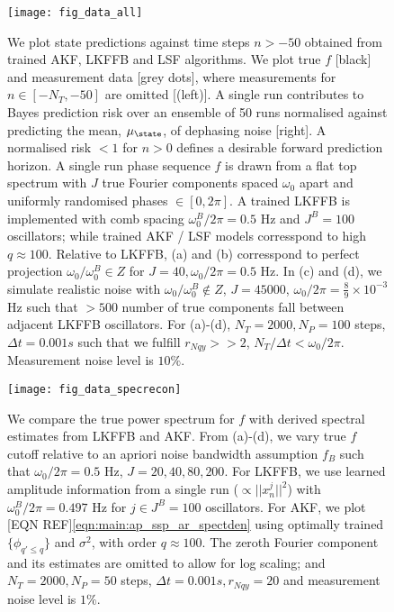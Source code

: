\begin{figure}
    \texttt{[image: fig\_data\_all]}
    \caption{\label{fig:main:fig_data_all} We plot state predictions against time steps $n > -50$ obtained from trained AKF, LKFFB and LSF algorithms. We plot true $f$ [black] and measurement data [grey dots], where measurements for $n \in [-N_T, -50]$ are omitted [(left)]. A single run contributes to Bayes prediction risk over an ensemble of 50 runs normalised against predicting the mean, $\mu_\state$, of dephasing noise [right]. A normalised risk $<1$ for $n > 0$ defines a desirable forward prediction horizon. A single run phase sequence $f$ is drawn from a flat top spectrum with $J$ true Fourier components spaced $\omega_0$ apart and uniformly randomised phases $\in [0, 2\pi]$. A trained LKFFB is implemented with comb spacing $\omega_0^B / 2\pi = 0.5$ Hz and $J^B =100$ oscillators; while trained AKF / LSF models corresspond to high $q \approx 100$. Relative to LKFFB,  (a) and (b) corresspond to perfect projection $\omega_0 / \omega_0^B  \in Z $ for $J= 40, \omega_0 / 2\pi = 0.5$ Hz. In (c) and (d), we simulate realistic noise with $\omega_0 / \omega_0^B  \notin Z$, $J = 45000$, $\omega_0 / 2\pi = \frac{8}{9} \times 10^{-3}$ Hz such that $>500$ number of true components fall between adjacent LKFFB oscillators. For (a)-(d), $N_T = 2000, N_P = 100$ steps, $\Delta t = 0.001s$ such that we fulfill $r_{Nqy} >> 2$, $N_T / \Delta t < \omega_0/2\pi$. Measurement noise level is $10\%$.}
\end{figure} 

\begin{figure}
    \texttt{[image: fig\_data\_specrecon]}
    \caption{\label{fig:main:fig_data_specrecon} We compare the true power spectrum for $f$ with derived spectral estimates from LKFFB and AKF. From (a)-(d), we vary true $f$ cutoff relative to an apriori noise bandwidth assumption $f_B$ such that $\omega_0 / 2\pi = 0.5$ Hz, $J = 20, 40, 80, 200$. For LKFFB, we use learned amplitude information from a single run ($\propto ||x^j_n||^2 $) with $\omega_0^B / 2\pi = 0.497$ Hz for $j \in J^B = 100$ oscillators. For AKF, we plot [EQN REF]\cref{eqn:main:ap_ssp_ar_spectden} using optimally trained $\{\phi_{q' \leq q}\}$ and $\sigma^2$, with order $q \approx 100$. The zeroth Fourier component and its estimates are omitted to allow for log scaling; and $N_T = 2000, N_P = 50$ steps, $\Delta t = 0.001s, r_{Nqy}=20$ and measurement noise level is $1\%$.} 
\end{figure} 


